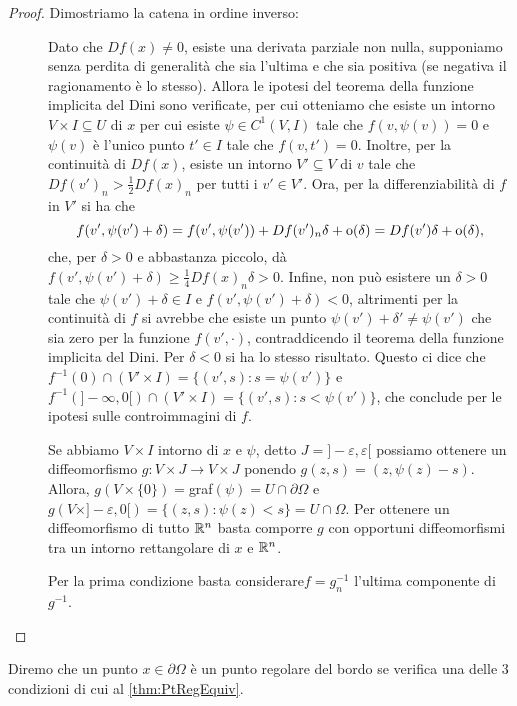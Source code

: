 \begin{proof}
	Dimostriamo la catena in ordine inverso:
	\begin{description}
		\item [] Dato che $Df(x)\neq 0$, esiste una derivata parziale non nulla, supponiamo senza perdita di
			generalità che sia l'ultima e che sia positiva (se negativa il ragionamento è lo stesso).
			Allora le ipotesi del teorema della funzione implicita del Dini sono verificate, per cui otteniamo
			che esiste un intorno $V\times I\subseteq U$ di $x$ per cui esiste $\psi\in C^1(V,I)$ tale che $f(v,\psi(v))=0$ e $\psi(v)$
			è l'unico punto $t'\in I$ tale che $f(v,t')=0$.
			Inoltre, per la continuità di $Df(x)$, esiste un intorno $V'\subseteq V$ di $v$ tale che $Df(v')_n>\frac{1}{2}Df(x)_n$ per tutti
			i $v'\in V'$. Ora, per la differenziabilità di $f$ in $V'$ si ha che
			\[
				f(v',\psi(v')+\delta)=f(v', \psi(v'))+Df(v')_n\delta+\mathrm{o}(\delta)=Df(v')\delta+\mathrm{o}(\delta),
			\]
			che, per $\delta>0$ e abbastanza piccolo, dà $f(v',\psi(v')+\delta)\geq \frac{1}{4}Df(x)_n\delta>0$. Infine, non può esistere un $\delta>0$ tale che $\psi(v')+\delta\in I$ e
			$f(v',\psi(v')+\delta)<0$, altrimenti per la continuità di $f$ si avrebbe che esiste un punto $\psi(v')+\delta'\neq \psi(v')$
			che sia zero per la funzione $f(v',\cdot)$, contraddicendo il teorema della funzione implicita del Dini.
			Per $\delta<0$ si ha lo stesso risultato. Questo ci dice che $f^{-1}(0)\cap (V'\times I)=\{(v',s):s=\psi(v')\}$ e
			$f^{-1}(]-\infty,0[)\cap (V'\times I)=\{(v',s):s<\psi(v')\}$, che conclude per le ipotesi sulle controimmagini di $f$.
		\item [] Se abbiamo $V\times I$ intorno di $x$ e $\psi$, detto $J=]-\varepsilon,\varepsilon[$
			possiamo ottenere un diffeomorfismo $g:V\times J \rightarrow V\times J$ ponendo $g(z,s)=(z,\psi(z)-s)$. Allora,
			$g(V\times \{0\})=$graf$(\psi)=U\cap \partial \Omega$ e $g(V\times ]-\varepsilon,0[)=\{(z,s):\psi(z)<s\}=U\cap \Omega$.
			Per ottenere un diffeomorfismo di tutto $\mathbb R^n$ basta comporre $g$ con opportuni diffeomorfismi tra un intorno rettangolare
			di $x$ e $\mathbb R^n$.
		\item [] Per la prima condizione basta considerare$f=g^{-1}_n$ l'ultima componente di $g^{-1}$.
	\end{description}
\end{proof}


\begin{definition}
	Diremo che un punto $x\in \partial \Omega$ è un punto regolare del bordo se verifica una delle $3$ condizioni di cui
	al \cref{thm:PtRegEquiv}.
\end{definition}

